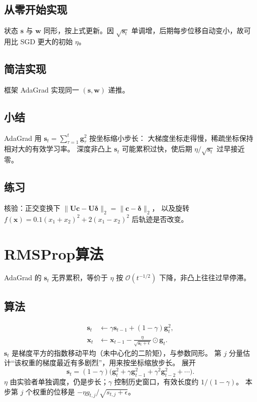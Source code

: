 \subsection{从零开始实现}

状态 $\bm{s}$ 与 $\bm{w}$ 同形，按上式更新。因 $\sqrt{\bm{s}_t}$ 单调增，后期每步位移自动变小，故可用比 SGD 更大的初始 $\eta$。

\subsection{简洁实现}

框架 AdaGrad 实现同一 $(\bm{s},\bm{w})$ 递推。

\subsection{小结}

AdaGrad 用 $\bm{s}_t=\sum_{\tau=1}^{t}\bm{g}_{\tau}^2$ 按坐标缩小步长：
大梯度坐标走得慢，稀疏坐标保持相对大的有效学习率。
深度非凸上 $\bm{s}_t$ 可能累积过快，使后期 $\eta/\sqrt{\bm{s}_t}$ 过早接近零。

\subsection{练习}

核验：正交变换下 $\|\bm{U}\bm{c}-\bm{U}\bm{\delta}\|_2=\|\bm{c}-\bm{\delta}\|_2$，
以及旋转 $f(\bm{x})=0.1(x_1+x_2)^2+2(x_1-x_2)^2$ 后轨迹是否改变。

\section{RMSProp算法}

AdaGrad 的 $\bm{s}_t$ 无界累积，等价于 $\eta$ 按 $\mathcal{O}(t^{-1/2})$ 下降，非凸上往往过早停滞。

\subsection{算法}

\begin{align*}
\bm{s}_t&\leftarrow\gamma\bm{s}_{t-1}+(1-\gamma)\bm{g}_t^2,
\\
\bm{x}_t&\leftarrow\bm{x}_{t-1}-\frac{\eta}{\sqrt{\bm{s}_t+\epsilon}}\odot\bm{g}_t.
\end{align*}
$\bm{s}_t$ 是梯度平方的指数移动平均（未中心化的二阶矩），与参数同形。
第 $j$ 分量估计“该权重的梯度最近有多剧烈”，用来按坐标缩放步长。
展开
\[
\bm{s}_t
=(1-\gamma)\bigl(\bm{g}_t^2+\gamma\bm{g}_{t-1}^2+\gamma^2\bm{g}_{t-2}^2+\cdots\bigr).
\]
$\eta$ 由实验者单独调度，仍是步长；$\gamma$ 控制历史窗口，有效长度约 $1/(1-\gamma)$。
本步第 $j$ 个权重的位移是 $-\eta g_{t,j}/\sqrt{s_{t,j}+\epsilon}$。


